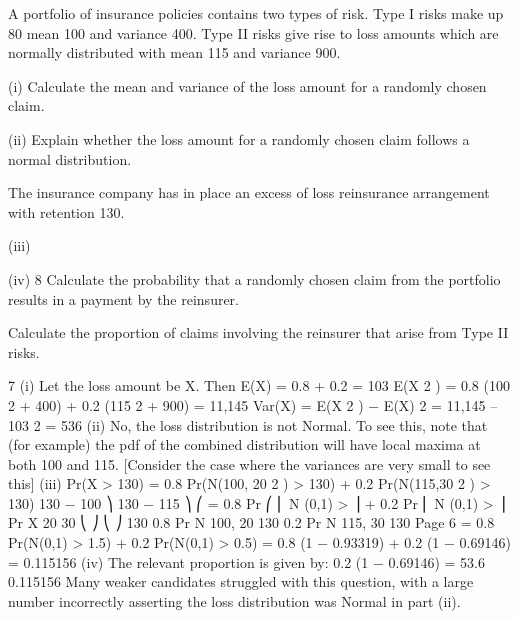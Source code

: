 
A portfolio of insurance policies contains two types of risk. Type I risks make up
80%
mean 100 and variance 400. Type II risks give rise to loss amounts which are
normally distributed with mean 115 and variance 900.
\item (i) Calculate the mean and variance of the loss amount for a randomly chosen
claim.

\item (ii) Explain whether the loss amount for a randomly chosen claim follows a
normal distribution.

The insurance company has in place an excess of loss reinsurance arrangement with
retention 130.
\item (iii)
\item (iv)
8
Calculate the probability that a randomly chosen claim from the portfolio
results in a payment by the reinsurer.

Calculate the proportion of claims involving the reinsurer that arise from Type
II risks.



7
(i)
Let the loss amount be X. Then
E(X) = 0.8  + 0.2  = 103
E(X 2 ) = 0.8 \times  (100 2 + 400) + 0.2 (115 2 + 900) = 11,145
Var(X) = E(X 2 ) − E(X) 2 = 11,145 – 103 2 = 536
(ii) No, the loss distribution is not Normal. To see this, note that (for example) the
pdf of the combined distribution will have local maxima at both 100 and 115.
[Consider the case where the variances are very small to see this]
(iii) Pr(X > 130) = 0.8 \times  Pr(N(100, 20 2 ) > 130) + 0.2 \times  Pr(N(115,30 2 ) > 130)
130 − 100 ⎞
130 − 115 ⎞
⎛
= 0.8 \times  Pr ⎛ ⎜ N (0,1) >
⎟ + 0.2 \times  Pr ⎜ N (0,1) >
⎟ Pr X
20
30
⎝
⎠
⎝
⎠
130
0.8 Pr N 100, 20
130
0.2 Pr N 115, 30
130
Page 6%
= 0.8 \times  Pr(N(0,1) > 1.5) + 0.2 \times  Pr(N(0,1) > 0.5)
= 0.8 \times  (1 − 0.93319) + 0.2 \times  (1 − 0.69146)
= 0.115156
(iv)
The relevant proportion is given by:
0.2 \times  (1 − 0.69146)
= 53.6%
0.115156
Many weaker candidates struggled with this question, with a large number incorrectly
asserting the loss distribution was Normal in part (ii).
